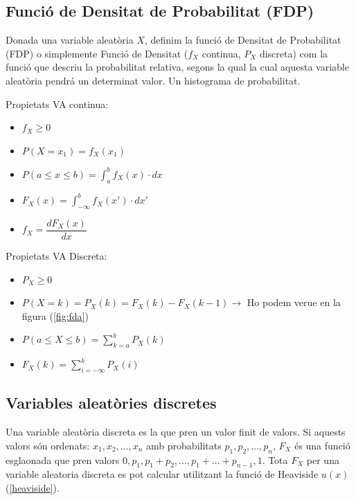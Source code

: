 \documentclass{article}
\begin{document}
\subsection{Funció de Densitat de Probabilitat (FDP)}

Donada una variable aleatòria $X$, definim la funció de Densitat de Probabilitat (FDP) o simplemente Funció de Densitat ($f_X$ continua, $P_X$ discreta) com la funció que descriu la probabilitat relativa, segons la qual la cual aquesta variable aleatòria pendrá un determinat valor. Un histograma de probabilitat.

Propietats VA continua:
\begin{itemize}
    \item $f_X \geq 0$
    \item $P(X=x_1) = f_X(x_1)$
    \item $P(a \leq x \leq b) = \displaystyle \int_{a}^{b} f_X(x) \cdot dx$
    \item $F_X(x) = \displaystyle \int_{-\infty}^{b} f_X(x') \cdot dx'$
    \item $f_X = \dfrac{dF_X(x)}{dx}$
\end{itemize}

Propietats VA Discreta:

\begin{itemize}
    \item $P_X \geq 0$
    \item $P(X=k) = P_X(k) = F_X(k) - F_X(k-1) \rightarrow$ Ho podem verue en la figura (\ref{fig:fda})
    \item $P(a \leq X \leq b) = \displaystyle \sum_{k=a}^{b} P_X(k)$
    \item $F_X(k) = \displaystyle \sum_{i=-\infty}^{k} P_X(i)$
\end{itemize}

\subsection{Variables aleatòries discretes}
Una variable aleatòria discreta es la que pren un valor finit de valors. Si aquests valors són ordenats: $x_1, x_2, \ldots, x_n$
amb probabilitats $p_1, p_2, \ldots , p_n$, $F_X$ és una funció esglaonada que pren valors $0, p_1, p_1 + p_2, \ldots , p_1+ \ldots + p_{n-1}, 1$. Tota $F_X$ per una variable aleatoria discreta es pot calcular utilitzant la funció de Heaviside $u(x)$ (\ref{heaviside}).
\end{document}
